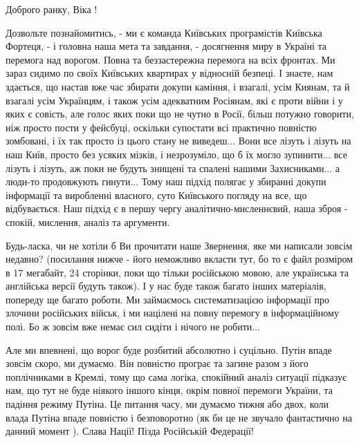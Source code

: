  
 
 
 
 

Доброго ранку, Віка !

Дозвольте познайомитись, - ми є команда Київських програмістів Київська
Фортеця, - і головна наша мета та завдання, - досягнення миру в Україні та
перемога над ворогом.  Повна та беззастережна перемога на всіх фронтах. Ми
зараз сидимо по своїх Київських квартирах у відносній безпеці. І знаєте, нам
здається, що настав вже час збирати докупи каміння, і взагалі, усім Киянам, та
й взагалі усім Українцям, і також усім адекватним Росіянам, які є проти війни і
у яких є совість, але голос яких поки що не чутно в Росії, більш потужно
говорити, ніж просто пости у фейсбуці, оскільки супостати всі практично
повністю зомбовані, і їх так просто із цього стану не виведеш... Вони все
лізуть і лізуть на наш Київ, просто без усяких мізків, і незрозуміло, що б їх могло
зупинити... все лізуть і лізуть, аж поки не будуть знищені та спалені нашими
Захисниками... а люди-то продовжують гинути...  Тому наш підхід полягає у
збиранні докупи інформації та виробленні власного, суто Київського погляду на
все, що відбувається. Наш підхід є в першу чергу аналітично-мисленнєвий, наша
зброя - спокій, мислення, аналіз та аргументи.

Будь-ласка, чи не хотіли б Ви прочитати наше Звернення, яке ми написали зовсім
недавно?  (посилання нижче - його неможливо вкласти тут, бо то є файл розміром
в 17 мегабайт, 24 сторінки, поки що тільки російською мовою, але українська та
англійська версії будуть також). І у нас буде також багато інших матеріалів,
попереду ще багато роботи. Ми займаємось систематизацією інформації про злочини
російських військ, і ми націлені на повну перемогу в інформаційному полі. Бо ж
зовсім вже немає сил сидіти і нічого не робити...

Але ми впевнені, що ворог буде розбитий абсолютно і суцільно. Путін впаде
зовсім скоро, ми думаємо.  Він повністю програє та загине разом з його
поплічниками в Кремлі, тому що сама логіка, спокійний аналіз ситуації підказує
нам, що тут не буде ніякого іншого кінця, окрім повної перемоги України, та
падіння режиму Путіна. Це питання часу, ми думаємо тижня або двох, коли влада
Путіна впаде повністю і безповоротно (як би це не звучало фантастично на данний
момент ). Слава Нації! Пізда Російській Федерації!

